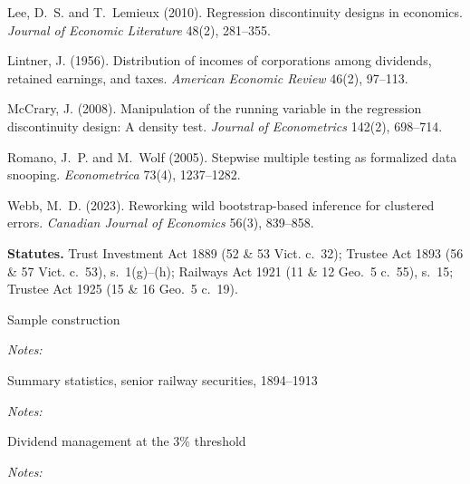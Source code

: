\documentclass[11pt]{article}
\newcommand{\tabnote}[1]{\par\vspace{3pt}\begin{minipage}{\textwidth}\footnotesize\setstretch{1}\textit{Notes:} \end{minipage}}
\begin{document}
\begin{thebibliography}{99}
Lee, D.~S. and T.~Lemieux (2010). Regression discontinuity designs in economics. \textit{Journal of Economic Literature} 48(2), 281--355.

Lintner, J. (1956). Distribution of incomes of corporations among dividends, retained earnings, and taxes. \textit{American Economic Review} 46(2), 97--113.

McCrary, J. (2008). Manipulation of the running variable in the regression discontinuity design: A density test. \textit{Journal of Econometrics} 142(2), 698--714.

Romano, J.~P. and M.~Wolf (2005). Stepwise multiple testing as formalized data snooping. \textit{Econometrica} 73(4), 1237--1282.

Webb, M.~D. (2023). Reworking wild bootstrap-based inference for clustered errors. \textit{Canadian Journal of Economics} 56(3), 839--858.

\end{thebibliography}

\noindent\textbf{Statutes.} Trust Investment Act 1889 (52 \& 53 Vict. c.~32); Trustee Act 1893 (56 \& 57 Vict. c.~53), s.~1(g)--(h); Railways Act 1921 (11 \& 12 Geo.~5 c.~55), s.~15; Trustee Act 1925 (15 \& 16 Geo.~5 c.~19).

\newpage
{}

\begin{table}[p]\centering
\caption{Sample construction}\label{tab:flow}

\tabnote{../output/exhibits/tables/table1_sample_flow_notes.tex}
\end{table}

\begin{table}[p]\centering
\caption{Summary statistics, senior railway securities, 1894--1913}\label{tab:summary}
\tabnote{../output/exhibits/tables/table2_summary_stats_notes.tex}
\end{table}

\begin{table}[p]\centering
\caption{Dividend management at the 3\% threshold}\label{tab:divmgmt}
\tabnote{../output/results/tables/table7_dividend_management_notes.tex}
\end{table}
\end{document}
